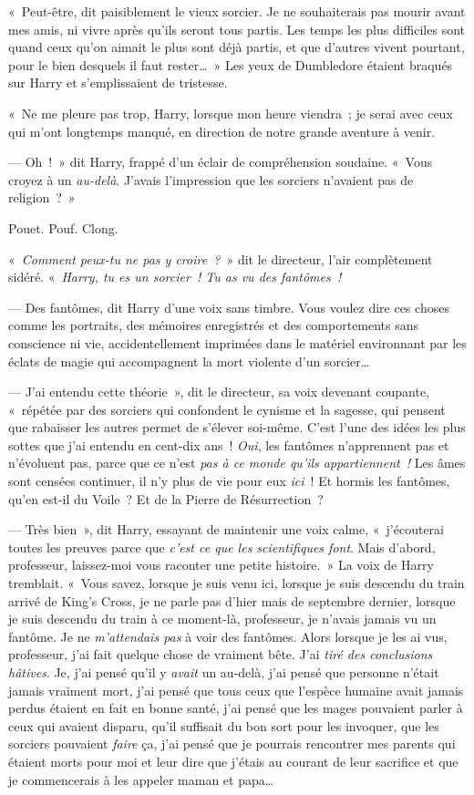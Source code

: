 «~Peut-être, dit paisiblement le vieux sorcier.
Je ne souhaiterais pas mourir avant mes amis, ni vivre après qu'ils seront tous partis.
Les temps les plus difficiles sont quand ceux qu'on aimait le plus sont déjà partis, et que d'autres vivent pourtant, pour le bien desquels il faut rester…~»
Les yeux de Dumbledore étaient braqués sur Harry et s'emplissaient de tristesse.

«~Ne me pleure pas trop, Harry, lorsque mon heure viendra~; je serai avec ceux qui m'ont longtemps manqué, en direction de notre grande aventure à venir.

--- Oh~!~»
dit Harry, frappé d'un éclair de compréhension soudaine.
«~Vous croyez à un \emph{au-delà}.
J'avais l'impression que les sorciers n'avaient pas de religion~?~»

\later

Pouet. Pouf.
Clong.

«~\emph{Comment peux-tu ne pas y croire~?}~» dit le directeur, l'air complètement sidéré.
«~\emph{Harry, tu es un sorcier~!
Tu as vu des fantômes~!}

--- Des fantômes, dit Harry d'une voix sans timbre.
Vous voulez dire ces choses comme les portraits, des mémoires enregistrés et des comportements sans conscience ni vie, accidentellement imprimées dans le matériel environnant par les éclats de magie qui accompagnent la mort violente d'un sorcier…

--- J'ai entendu cette théorie~», dit le directeur, sa voix devenant coupante, «~répétée par des sorciers qui confondent le cynisme et la sagesse, qui pensent que rabaisser les autres permet de s'élever soi-même.
C'est l'une des idées les plus sottes que j'ai entendu en cent-dix ans~!
\emph{Oui}, les fantômes n'apprennent pas et n'évoluent pas, parce que ce n'est \emph{pas à ce monde qu'ils appartiennent~!} Les âmes sont censées continuer, il n'y plus de vie pour eux \emph{ici}~!
Et hormis les fantômes, qu'en est-il du Voile~?
Et de la Pierre de Résurrection~?

--- Très bien~», dit Harry, essayant de maintenir une voix calme, «~j'écouterai toutes les preuves parce que \emph{c'est ce que les scientifiques font}.
Mais d'abord, professeur, laissez-moi vous raconter une petite histoire.~»
La voix de Harry tremblait.
«~Vous savez, lorsque je suis venu ici, lorsque je suis descendu du train arrivé de King's Cross, je ne parle pas d'hier mais de septembre dernier, lorsque je suis descendu du train à ce moment-là, professeur, je n'avais jamais vu un fantôme.
Je ne \emph{m'attendais pas} à voir des fantômes.
Alors lorsque je les ai vus, professeur, j'ai fait quelque chose de vraiment bête.
J'ai \emph{tiré des conclusions hâtives}.
Je, j'ai pensé qu'il y \emph{avait} un au-delà, j'ai pensé que personne n'était jamais vraiment mort, j'ai pensé que tous ceux que l'espèce humaine avait jamais perdus étaient en fait en bonne santé, j'ai pensé que les mages pouvaient parler à ceux qui avaient disparu, qu'il suffisait du bon sort pour les invoquer, que les sorciers pouvaient \emph{faire} ça, j'ai pensé que je pourrais rencontrer mes parents qui étaient morts pour moi et leur dire que j'étais au courant de leur sacrifice et que je commencerais à les appeler maman et papa…

